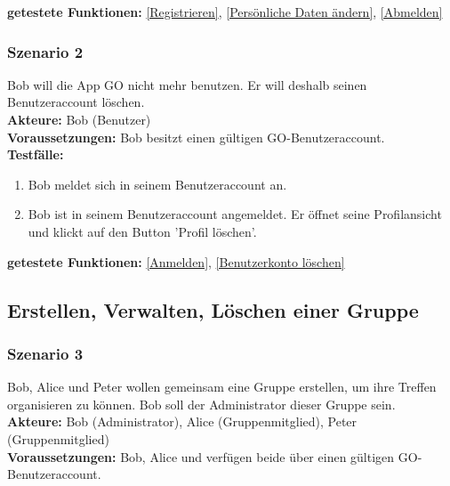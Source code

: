 \documentclass[parskip=full]{scrartcl}
\def\threedigits#1{%
  \ifnum#1<100 0\fi
  \ifnum#1<10 0\fi
  \number#1}
\begin{document}
\textbf{getestete Funktionen: }\ref{Registrieren}, \ref{Persönliche Daten ändern}, \ref{Abmelden}

\subsubsection*{Szenario 2}Bob will die App GO nicht mehr benutzen. Er will deshalb seinen Benutzeraccount löschen. \\

\textbf{Akteure:} Bob (Benutzer) \\

\textbf{Voraussetzungen: }Bob besitzt einen gültigen GO-Benutzeraccount.\\

\textbf{Testfälle:}
\begin{enumerate}[label={\textbf{/T\protect\threedigits{\theenumi}0/}}, leftmargin=*, resume]
	\item Bob meldet sich in seinem Benutzeraccount an. 
	\item Bob ist in seinem Benutzeraccount angemeldet. Er öffnet seine Profilansicht und klickt auf den Button 'Profil löschen'.
\end{enumerate}

\textbf{getestete Funktionen: }\ref{Anmelden}, \ref{Benutzerkonto löschen}

\subsection{Erstellen, Verwalten, Löschen einer Gruppe}

\subsubsection*{Szenario 3} Bob, Alice und Peter wollen gemeinsam eine Gruppe erstellen, um ihre Treffen organisieren zu können. Bob soll der Administrator dieser Gruppe sein.\\

\textbf{Akteure:} Bob (Administrator), Alice (Gruppenmitglied), Peter (Gruppenmitglied) \\

\textbf{Voraussetzungen: }Bob, Alice und verfügen beide über einen gültigen GO-Benutzeraccount.\\
\end{document}
